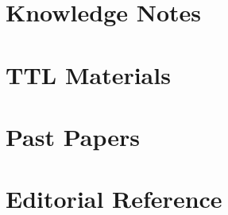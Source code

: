 \documentclass[solutions]{course-notes}
\begin{document}
\CourseFrontMatter



\part{Knowledge Notes}


\part{TTL Materials}


\part{Past Papers}


\appendix
\part{Editorial Reference}

\end{document}
